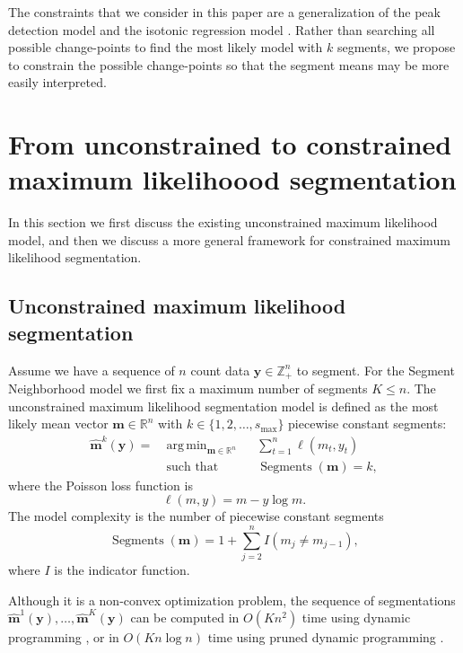 \documentclass{article}
\DeclareMathOperator*{\argmin}{arg\,min}
\DeclareMathOperator*{\Segments}{Segments}
\newcommand{\ZZ}{\mathbb Z}
\newcommand{\RR}{\mathbb R}
\begin{document}
The constraints that we consider in this paper are a generalization of
the peak detection model \citep{PeakSeg} and the isotonic regression
model \citep{mair2009isotone}. Rather than searching all possible
change-points to find the most likely model with $k$ segments, we
propose to constrain the possible change-points so that the segment
means may be more easily interpreted.

\section{From unconstrained to constrained maximum likelihoood
  segmentation}
\label{sec:model}

In this section we first discuss the existing unconstrained maximum
likelihood model, and then we discuss a more general framework for
constrained maximum likelihood segmentation.

\subsection{Unconstrained maximum likelihood segmentation}

Assume we have a sequence of $n$ count data $\mathbf y\in\ZZ_+^n$ to
segment. For the Segment Neighborhood model we first fix a maximum
number of segments $ K\leq n$. The unconstrained
maximum likelihood segmentation model is defined as the most likely
mean vector $\mathbf m\in\RR^n$ with $k\in\{1, 2, \dots, s_{\max}\}$
piecewise constant segments:
\begin{align}
  \label{unconstrained}
  \mathbf{\hat m}^k(\mathbf y)  =\ 
  &\argmin_{\mathbf m\in\RR^{n}} && 
\sum_{t=1}^n  \ell
  (m_t,  y_t) \\
  &\text{such that} && \Segments(\mathbf m)=k,
  \nonumber
\end{align}
where the Poisson loss function is
\begin{equation}\label{eq:loss}
  \ell( m,  y)= m - y \log m.
\end{equation} 
The model complexity is the number of piecewise constant segments
\begin{equation}
  \Segments(\mathbf m)=1+\sum_{j=2}^n I(m_j \neq m_{j-1}),
\end{equation}
where $I$ is the indicator function. 

Although it is a non-convex optimization problem, the sequence of
segmentations $\mathbf{\hat m}^1(\mathbf y), \dots, \mathbf{\hat
  m}^{K}(\mathbf y)$ can be computed in
$O(K n^2)$ time using dynamic programming
\citep{bellman}, or in $O(K n \log n)$
time using pruned dynamic programming \citep{pruned-dp, Segmentor}.
\end{document}
